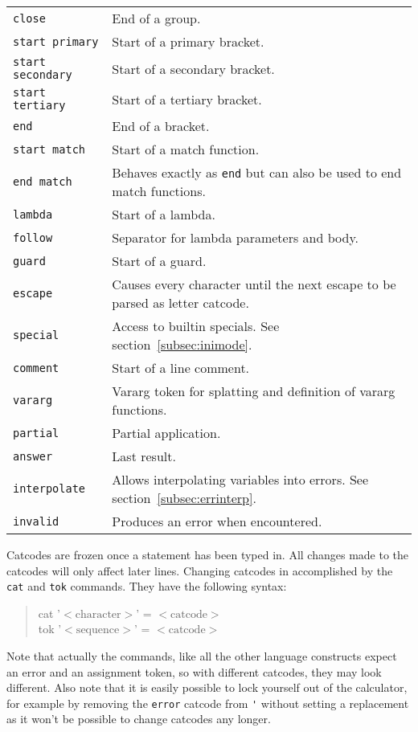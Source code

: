 \documentclass[10pt]{article}
\newcommand{\argument}[1]{{${\big<}\mathrm{#1}{\big>}$}}
\newenvironment{code}{\begin{quote}\ttfamily}{\end{quote}}
\begin{document}
\begin{longtable}{p{}p{}}
        \verb|close|           & End of a group. \\
        \verb|start primary|   & Start of a primary bracket. \\
        \verb|start secondary| & Start of a secondary bracket. \\
        \verb|start tertiary|  & Start of a tertiary bracket. \\
        \verb|end|             & End of a bracket. \\
        \verb|start match|     & Start of a match function. \\
        \verb|end match|       & Behaves exactly as \verb|end| but can also be used to end match functions. \\
        \verb|lambda|          & Start of a lambda. \\
        \verb|follow|          & Separator for lambda parameters and body. \\
        \verb|guard |          & Start of a guard. \\
        \verb|escape|          & Causes every character until the next escape to be parsed as letter catcode. \\
        \verb|special|         & Access to builtin specials. See section~\ref{subsec:inimode}. \\
        \verb|comment|         & Start of a line comment. \\
        \verb|vararg|          & Vararg token for splatting and definition of vararg functions. \\
        \verb|partial|         & Partial application. \\
        \verb|answer|          & Last result. \\
        \verb|interpolate|     & Allows interpolating variables into errors. See section~\ref{subsec:errinterp}. \\
        \verb|invalid|         & Produces an error when encountered. \\
    \end{longtable}
    Catcodes are frozen once a statement has been typed in.
    All changes made to the catcodes will only affect later lines.
    Changing catcodes in accomplished by the \verb|cat| and \verb|tok| commands.
    They have the following syntax:
    \begin{code}
        cat '\argument{character}' = \argument{catcode} \\
        tok '\argument{sequence}' = \argument{catcode}
    \end{code}
    Note that actually the commands, like all the other language constructs expect an error and an assignment token, so with different catcodes, they may look different.
    Also note that it is easily possible to lock yourself out of the calculator, for example by removing the \verb|error| catcode from \verb|'| without setting a replacement as it won't be possible to change catcodes any longer.
    
\end{document}
